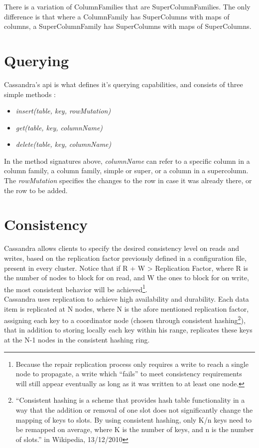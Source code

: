 There is a variation of ColumnFamilies that are SuperColumnFamilies. The only difference is that where a ColumnFamily has SuperColumns with maps of columns, a SuperColumnFamily has SuperColumns with maps of SuperColumns. 

\section{Querying}
Cassandra's \ac{api} is what defines it's querying capabilities, and consists of three simple methods \cite{lakshmanMalik}:

\begin{itemize}
	\item \emph{insert(table, key, rowMutation)}
	\item \emph{get(table, key, columnName)}
	\item \emph{delete(table, key, columnName)}
\end{itemize}	

In the method signatures above, \emph{columnName} can refer to a specific column in a column family, a column family, simple or super, or a column in a supercolumn. The \emph{rowMutation} specifies the changes to the row in case it was already there, or the row to be added.

\section{Consistency}
Cassandra allows clients to specify the desired consistency level on reads and writes, based on the replication factor previously defined in a configuration file, present in every cluster. Notice that if R + W > Replication Factor, where R is the number of nodes to block for on read, and W the ones to block for on write, the most consistent behavior will be achieved\footnote{Because the repair replication process only requires a write to reach a single node to propagate, a write which ``fails'' to meet consistency requirements will still appear eventually as long as it was written to at least one node.}.\\

Cassandra uses replication to achieve high availability and durability. Each data item is replicated at N nodes, where N is the afore mentioned replication factor, assigning each key to a coordinator node (chosen through consistent hashing\footnote{``Consistent hashing is a scheme that provides hash table functionality in a way that the addition or removal of one slot does not significantly change the mapping of keys to slots. By using consistent hashing, only K/n keys need to be remapped on average, where K is the number of keys, and n is the number of slots.'' in Wikipedia, 13/12/2010}), that in addition to storing locally each key within his range, replicates these keys at the N-1 nodes in the consistent hashing ring. 

